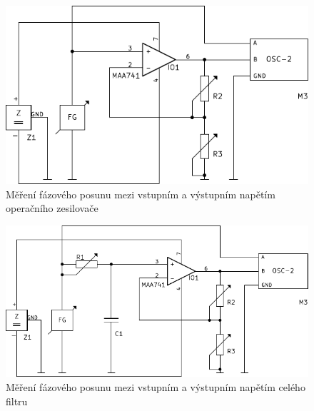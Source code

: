   \begin{figure}[H]
    \centering
    \includegraphics[width=13.9446cm]{../img/OZ_phi.pdf}
    \caption{Měření fázového posunu mezi vstupním a výstupním napětím operačního zesilovače}
    \label{sch:4}
  \end{figure}
  
  \begin{figure}[H]
    \centering
    \includegraphics[width=16.4211cm]{../img/RC_OZ_phi.pdf}
    \caption{Měření fázového posunu mezi vstupním a výstupním napětím celého filtru}
    \label{sch:5}
  \end{figure}
  

